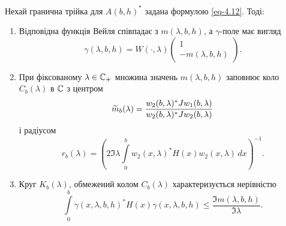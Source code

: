 \begin{theorem}\label{th-4.3}
	Нехай гранична трійка для $A(b,h)^*$ задана формулою \eqref{eq-4.12}. Тоді:
	\begin{enumerate}
		\item Відповідна функція Вейля співпадає з $m(\lambda,b,h)$, а $\gamma$-поле має вигляд
		\begin{equation}\label{eq-4.15}
			\gamma(\lambda,b,h) = W(\cdot,\lambda)
			\begin{pmatrix}
				1 \\ -m(\lambda,b,h)
			\end{pmatrix}.
		\end{equation}
		\item При фіксованому $\lambda\in\mathbb{C}_+$ множина значень $m(\lambda,b,h)$ заповнює коло $C_b(\lambda)$ в $\mathbb{C}$ з центром
		\begin{equation}\label{eq-4.16}
			\widetilde{m}_b(\lambda) = \frac{w_2(b,\lambda)^* Jw_1(b,\lambda)}{w_2(b,\lambda)^* Jw_2(b,\lambda)}
		\end{equation}
		і радіусом
		\begin{equation}\label{eq-4.17}
			r_b(\lambda) = \left(2\Im{\lambda}\int\limits_0^b w_2(x,\lambda)^* H(x) w_2(x,\lambda)\,dx \right)^{-1}.
		\end{equation}
		\item Круг $K_b(\lambda)$, обмежений колом $C_b(\lambda)$ характеризується нерівністю
		\begin{equation}\label{eq-4.18}
			\int\limits_0^b \gamma(x,\lambda,b,h)^* H(x) \gamma(x,\lambda,b,h) \le \frac{\Im{m(\lambda,b,h)}}{\Im{\lambda}}.
		\end{equation}
	\end{enumerate}
\end{theorem}
